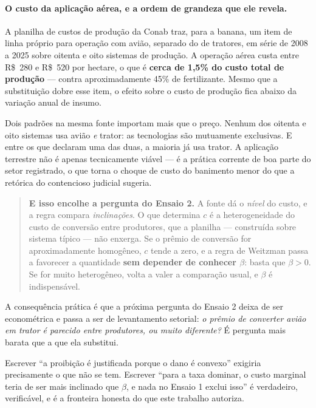 \paragraph{O custo da aplicação aérea, e a ordem de grandeza que ele revela.}
A planilha de custos de produção da Conab traz, para a banana, um item de linha
próprio para operação com avião, separado do de tratores, em série de 2008 a
2025 sobre oitenta e oito sistemas de produção. A operação aérea custa entre
R\$~280 e R\$~520 por hectare, o que é \textbf{cerca de 1,5\% do custo total de
produção} --- contra aproximadamente 45\% de fertilizante. Mesmo que a
substituição dobre esse item, o efeito sobre o custo de produção fica abaixo da
variação anual de insumo.

Dois padrões na mesma fonte importam mais que o preço. Nenhum dos oitenta e oito
sistemas usa avião \emph{e} trator: as tecnologias são mutuamente exclusivas.
E entre os que declaram uma das duas, a maioria já usa trator. A aplicação
terrestre não é apenas tecnicamente viável --- é a prática corrente de boa parte
do setor registrado, o que torna o choque de custo do banimento menor do que a
retórica do contencioso judicial sugeria.

\begin{quote}
\textbf{E isso encolhe a pergunta do Ensaio 2.} A fonte dá o \emph{nível} do
custo, e a regra compara \emph{inclinações}. O que determina \(c\) é a
heterogeneidade do custo de conversão entre produtores, que a planilha ---
construída sobre sistema típico --- não enxerga. Se o prêmio de conversão for
aproximadamente homogêneo, \(c\) tende a zero, e a regra de Weitzman passa a
favorecer a quantidade \textbf{sem depender de conhecer \(\beta\)}: basta que
\(\beta > 0\). Se for muito heterogêneo, volta a valer a comparação usual, e
\(\beta\) é indispensável.
\end{quote}

A consequência prática é que a próxima pergunta do Ensaio 2 deixa de ser
econométrica e passa a ser de levantamento setorial: \emph{o prêmio de converter
avião em trator é parecido entre produtores, ou muito diferente?} É pergunta
mais barata que a que ela substitui.

Escrever ``a proibição é justificada porque o dano é convexo'' exigiria
precisamente o que não se tem. Escrever ``para a taxa dominar, o custo marginal
teria de ser mais inclinado que \(\beta\), e nada no Ensaio 1 exclui isso'' é
verdadeiro, verificável, e é a fronteira honesta do que este trabalho autoriza.

